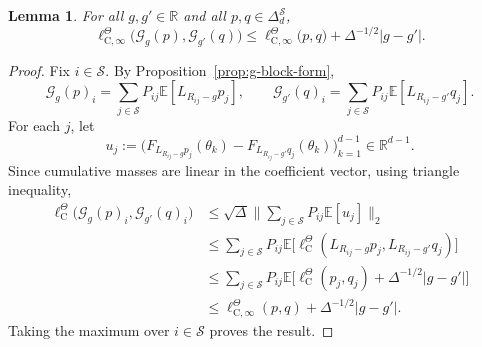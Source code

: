 \documentclass{article}
\newtheorem{lemma}[theorem]{Lemma}
\newcommand{\X}{\mathcal{S}}
\newcommand{\R}{\mathbb{R}}
\newcommand{\E}{\mathbb{E}}
\begin{document}
\begin{lemma}\label{lem:appC-2}
For all $g, g' \in \R$ and all $p, q \in \Delta^\X_d$,
\begin{equation}
\ell^\Theta_{\mathrm C, \infty}\bigl(\mathcal G_g(p), \mathcal G_{g'}(q) \bigr) \le \ell^\Theta_{\mathrm C, \infty}\bigl(p, q\bigr) + \Delta^{-1/2}\lvert g - g'\rvert.
\end{equation}
\end{lemma}

\begin{proof}
Fix $i \in \X$. By Proposition~\ref{prop:g-block-form},
\begin{equation}
\mathcal G_g(p)_i = \sum_{j\in \X} P_{ij} \E[L_{R_{ij} -g}p_j],\qquad \mathcal G_{g'}(q)_i = \sum_{j\in \X} P_{ij} \E[L_{R_{ij} -g'}q_j].
\end{equation}
For each $j$, let
\begin{equation}
u_j := \bigl( F_{L_{R_{ij} -g}p_j}(\theta_k) - F_{L_{R_{ij} -g'}q_j}(\theta_k)\bigr)^{d-1}_{k=1} \in \R^{d-1}.
\end{equation}
Since cumulative masses are linear in the coefficient vector, using triangle inequality,
\begin{equation}
\begin{aligned}
\ell^\Theta_\mathrm C\bigl( \mathcal G_g(p)_i, \mathcal G_{g'}(q)_i\bigr) &\le \sqrt{\Delta} \bigl\lVert\sum_{j \in \X}P_{ij}\E[u_j]\bigr\rVert_2 \\
&\le \sum_{j \in \X} P_{ij} \E \bigl[\ell^\Theta_\mathrm C(L_{R_{ij} - g}p_j, L_{R_{ij}-g'}q_j) \bigr] \\
&\le \sum_{j\in \X} P_{ij} \E\bigl[\ell^\Theta_\mathrm C(p_j, q_j) + \Delta^{-1/2}\lvert g- g' \rvert \bigr] \\
&\le \ell^\Theta_{\mathrm C, \infty}(p, q) + \Delta^{-1/2}\lvert g - g'\rvert.
\end{aligned}
\end{equation}
Taking the maximum over $i \in \X$ proves the result.
\end{proof}
\end{document}
